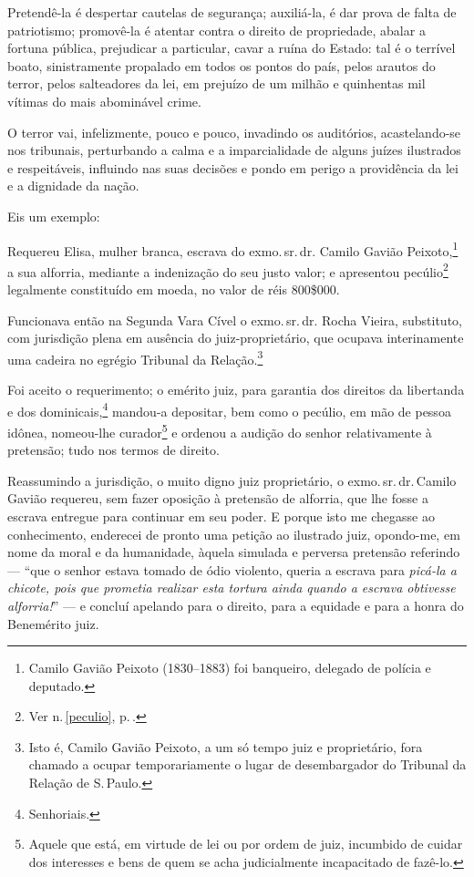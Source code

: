 {Pretendê-la é despertar cautelas de segurança; auxiliá-la, é dar prova
de falta de patriotismo; promovê-la é atentar contra o direito de
propriedade, abalar a fortuna pública, prejudicar a particular, cavar a
ruína do Estado: tal é o terrível boato, sinistramente propalado em
todos os pontos do país, pelos arautos do terror, pelos salteadores da
lei, em prejuízo de um milhão e quinhentas mil vítimas do mais
abominável crime.

O terror vai, infelizmente, pouco e pouco, invadindo os auditórios,
acastelando-se nos tribunais, perturbando a calma e a imparcialidade de
alguns juízes ilustrados e respeitáveis, influindo nas suas decisões e
pondo em perigo a providência da lei e a dignidade da nação.

Eis um exemplo:

Requereu Elisa, mulher branca, escrava do exmo.\,sr.\,dr. Camilo Gavião Peixoto,\footnote{Camilo Gavião Peixoto (1830--1883) foi banqueiro,
  delegado de polícia e deputado.} a sua alforria, mediante a
indenização do seu justo valor; e apresentou pecúlio\footnote{
  Ver n.\,\ref{peculio}, p.\,\pageref{peculio}.} legalmente constituído em moeda,
no valor de réis 800\$000.

Funcionava então na Segunda Vara Cível o exmo.\,sr.\,dr. Rocha Vieira,
substituto, com jurisdição plena em ausência do juiz-proprietário, que
ocupava interinamente uma cadeira no egrégio Tribunal da
Relação.\footnote{Isto é, Camilo Gavião Peixoto, a um só tempo juiz e
  proprietário, fora chamado a ocupar temporariamente o lugar de
  desembargador do Tribunal da Relação de S.\,Paulo.}

Foi aceito o requerimento; o emérito juiz, para garantia dos direitos da
libertanda e dos dominicais,\footnote{Senhoriais.} mandou-a depositar,
bem como o pecúlio, em mão de pessoa idônea, nomeou-lhe
curador\footnote{Aquele que está, em virtude de lei ou por ordem de
  juiz, incumbido de cuidar dos interesses e bens de quem se acha
  judicialmente incapacitado de fazê-lo.} e ordenou a audição do senhor
relativamente à pretensão; tudo nos termos de direito.

Reassumindo a jurisdição, o muito digno juiz proprietário, o exmo.\,sr.\,dr.\,Camilo Gavião requereu, sem fazer oposição à pretensão de alforria,
que lhe fosse a escrava entregue para continuar em seu poder. E porque
isto me chegasse ao conhecimento, enderecei de pronto uma petição ao
ilustrado juiz, opondo-me, em nome da moral e da humanidade, àquela
simulada e perversa pretensão referindo --- ``que o senhor estava
tomado de ódio violento, queria a escrava para \emph{picá-la a chicote,
pois que prometia realizar esta tortura ainda quando a escrava obtivesse
alforria!}'' --- e concluí apelando para o direito, para a equidade
e para a honra do Benemérito juiz.

}
